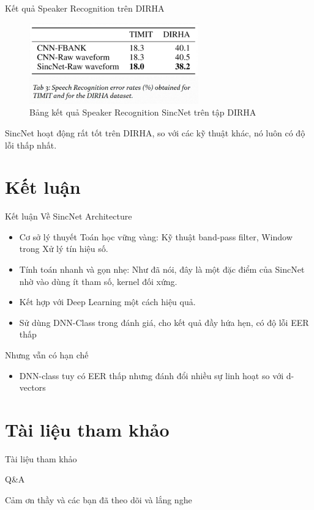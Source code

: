 \documentclass[11pt]{beamer}
\begin{document}
\begin{frame}{Kết quả Speaker Recognition trên DIRHA}
	\begin{figure}[H]
		\centering
		\includegraphics[width=0.65\textwidth]{images/sr_sincnet_result.png}
		\caption{Bảng kết quả Speaker Recognition SincNet trên tập DIRHA}
		\label{fig:writing-thesis}
	\end{figure}
	SincNet hoạt động rất tốt trên DIRHA, so với các kỹ thuật khác, nó luôn có độ lỗi thấp nhất.	
\end{frame}

\section{Kết luận}
\begin{frame}{Kết luận}
	Về SincNet Architecture
	\begin{itemize}
		\item Cơ sở lý thuyết Toán học vững vàng: Kỹ thuật band-pass filter, Window trong Xử lý tín hiệu số.
		\item Tính toán nhanh và gọn nhẹ: Như đã nói, đây là một đặc điểm của SincNet nhờ vào dùng ít tham số, kernel đối xứng.
		\item Kết hợp với Deep Learning một cách hiệu quả.
		\item Sử dùng DNN-Class trong đánh giá, cho kết quả đầy hứa hẹn, có độ lỗi EER thấp
	\end{itemize}
	Nhưng vẫn có hạn chế
	\begin{itemize}
		\item DNN-class tuy có EER thấp nhưng đánh đổi nhiều sự linh hoạt so với d-vectors
	\end{itemize}
\end{frame}

\section{Tài liệu tham khảo}
\begin{frame}{Tài liệu tham khảo}
	\nocite{*}
	\newpage\cleardoublepage
	
\end{frame}


\begin{frame}{Q\&A}
	\begin{center}
		\Huge Cảm ơn thầy và các bạn đã theo dõi và lắng nghe
	\end{center}
\end{frame}
\end{document}
